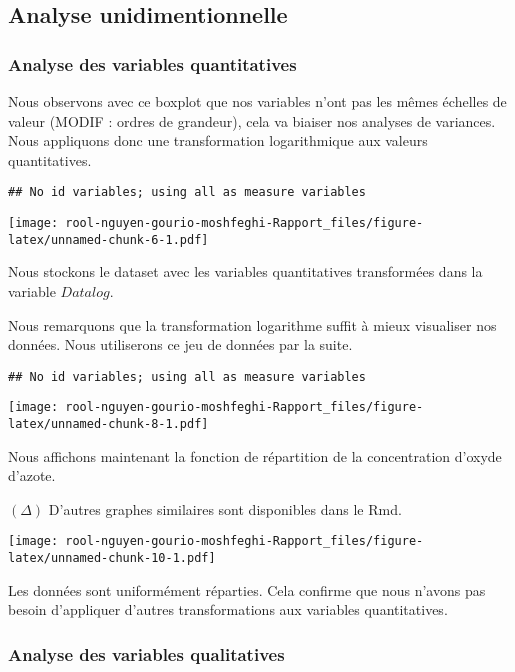 \documentclass[
]{article}
\begin{document}
\hypertarget{analyse-unidimentionnelle}{%
\subsection{Analyse unidimentionnelle}\label{analyse-unidimentionnelle}}

\hypertarget{analyse-des-variables-quantitatives}{%
\subsubsection{Analyse des variables
quantitatives}\label{analyse-des-variables-quantitatives}}

Nous observons avec ce boxplot que nos variables n'ont pas les mêmes
échelles de valeur (MODIF : ordres de grandeur), cela va biaiser nos
analyses de variances. Nous appliquons donc une transformation
logarithmique aux valeurs quantitatives.

\begin{verbatim}
## No id variables; using all as measure variables
\end{verbatim}

\texttt{[image: rool-nguyen-gourio-moshfeghi-Rapport\_files/figure-latex/unnamed-chunk-6-1.pdf]}

Nous stockons le dataset avec les variables quantitatives transformées
dans la variable \(Datalog\).

Nous remarquons que la transformation logarithme suffit à mieux
visualiser nos données. Nous utiliserons ce jeu de données par la suite.

\begin{verbatim}
## No id variables; using all as measure variables
\end{verbatim}

\texttt{[image: rool-nguyen-gourio-moshfeghi-Rapport\_files/figure-latex/unnamed-chunk-8-1.pdf]}

Nous affichons maintenant la fonction de répartition de la concentration
d'oxyde d'azote.

\((\Delta)\) D'autres graphes similaires sont disponibles dans le Rmd.

\texttt{[image: rool-nguyen-gourio-moshfeghi-Rapport\_files/figure-latex/unnamed-chunk-10-1.pdf]}

Les données sont uniformément réparties. Cela confirme que nous n'avons
pas besoin d'appliquer d'autres transformations aux variables
quantitatives.

\hypertarget{analyse-des-variables-qualitatives}{%
\subsubsection{Analyse des variables
qualitatives}\label{analyse-des-variables-qualitatives}}
\end{document}
